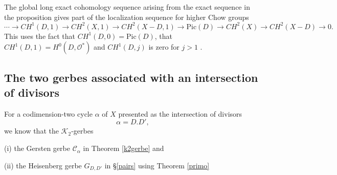 \documentclass{amsart}
\numberwithin{equation}{subsection}
\theoremstyle{remark}
\theoremstyle{remark}
\newcommand{\too}{\longrightarrow}%
\newcommand{\cC}{\mathcal{C}}
\newcommand{\cK}{\mathcal{K}}
\newcommand{\cO}{\mathcal{O}}
\begin{document}
The global long exact cohomology sequence arising from the exact sequence in the
proposition gives  part of the localization sequence for higher Chow groups
\begin{equation*}
  \cdots \too CH^1(D,1) \too CH^2(X, 1) \too CH^2(X-D,1) \too \mathrm{Pic}(D) \too CH^2(X) \too CH^2(X -D) \too 0.
\end{equation*}
This uses the fact that $CH^1(D,0) =\mathrm{Pic}(D)$, that $CH^1(D,1) = H^0(D, \cO^*)$ and $CH^1(D,j)$ is zero for $j >1$ \cite[ (viii), p.~269]{Bloch2}.

\subsection{The two gerbes associated with an intersection of divisors} For a codimension-two cycle $\alpha$ of $X$ presented as the intersection of divisors \[\alpha = D. D',\] we know that the $\cK_2$-gerbes

(i) the Gersten gerbe $\cC_{\alpha}$ in Theorem \ref{k2gerbe} and

(ii) the Heisenberg gerbe $G_{D,D'}$  in \S \ref{pairs} using Theorem \ref{primo} 
\end{document}
